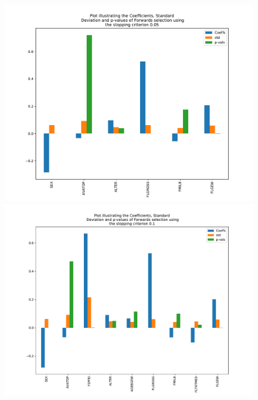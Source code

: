 \documentclass[]{article}
\begin{document}
\begin{figure}[H]
\begin{minipage}[H]{0.5\linewidth}
		\vspace{4ex}
	\end{minipage} 
	\begin{minipage}[H]{0.5\linewidth}
		\centering
		\includegraphics[width=1.11\linewidth]{figures/FS_005.pdf}
		\vspace{4ex}
	\end{minipage}%
	\begin{minipage}[H]{0.5\linewidth}
		\centering
		\includegraphics[width=1.11\linewidth]{figures/FS_01.pdf}
		\vspace{4ex}
	\end{minipage} 
\end{figure}
\end{document}
